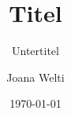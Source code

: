 \documentclass[fontsize=11pt,paper=a4]{scrartcl}
\begin{document}
\title{Titel}
\subtitle{Untertitel}
\date{\today}
\author{Joana Welti}
\maketitle

\tableofcontents








\end{document}
